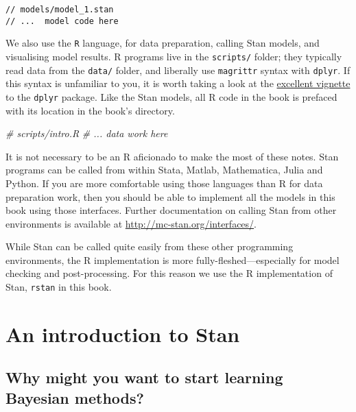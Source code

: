 \documentclass[]{book}
\newenvironment{Shaded}{\begin{snugshade}}{\end{snugshade}}
\newcommand{\CommentTok}[1]{\textcolor[rgb]{0.56,0.35,0.01}{\textit{{#1}}}}
\begin{document}
\begin{verbatim}
// models/model_1.stan
// ...  model code here
\end{verbatim}

We also use the \texttt{R} language, for data preparation, calling Stan
models, and visualising model results. R programs live in the
\texttt{scripts/} folder; they typically read data from the
\texttt{data/} folder, and liberally use \texttt{magrittr} syntax with
\texttt{dplyr}. If this syntax is unfamiliar to you, it is worth taking
a look at the
\href{https://cran.rstudio.com/web/packages/dplyr/vignettes/introduction.html}{excellent
vignette} to the \texttt{dplyr} package. Like the Stan models, all R
code in the book is prefaced with its location in the book's directory.

\begin{Shaded}
\begin{Highlighting}[]
\CommentTok{# scripts/intro.R}
\CommentTok{# ... data work here}
\end{Highlighting}
\end{Shaded}

It is not necessary to be an R aficionado to make the most of these
notes. Stan programs can be called from within Stata, Matlab,
Mathematica, Julia and Python. If you are more comfortable using those
languages than R for data preparation work, then you should be able to
implement all the models in this book using those interfaces. Further
documentation on calling Stan from other environments is available at
\url{http://mc-stan.org/interfaces/}.

While Stan can be called quite easily from these other programming
environments, the R implementation is more fully-fleshed---especially
for model checking and post-processing. For this reason we use the R
implementation of Stan, \texttt{rstan} in this book.

\chapter{An introduction to Stan}\label{intro}

\section{Why might you want to start learning Bayesian
methods?}\label{why-might-you-want-to-start-learning-bayesian-methods}
\end{document}
